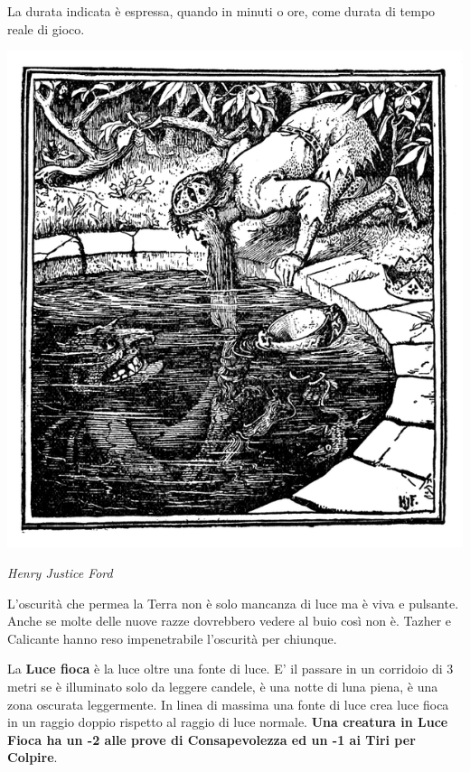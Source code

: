 \begin{multicols}{2}
\smallskip

La durata indicata è espressa, quando in minuti o ore, come durata di tempo reale di gioco.

\medskip

\begin{center}
\includegraphics[width=0.8\linewidth]{immagini/oscurita.png}

\emph{Henry Justice Ford}
\end{center}

\begin{giocatore}{
L'oscurità che permea la Terra non è solo mancanza di luce ma è viva e pulsante. Anche se molte delle nuove razze dovrebbero vedere al buio così non è. Tazher e Calicante hanno reso impenetrabile l'oscurità per chiunque.
}\end{giocatore}

\medskip

La \textbf{Luce fioca} è la luce oltre una fonte di luce. E' il passare in un corridoio di 3 metri se è illuminato solo da leggere candele, è una notte di luna piena, è una zona oscurata leggermente.
In linea di massima una fonte di luce crea luce fioca in un raggio doppio rispetto al raggio di luce normale. \textbf{Una creatura in Luce Fioca ha un -2 alle prove di Consapevolezza ed un -1 ai Tiri per Colpire}.

\medskip


\end{multicols}
